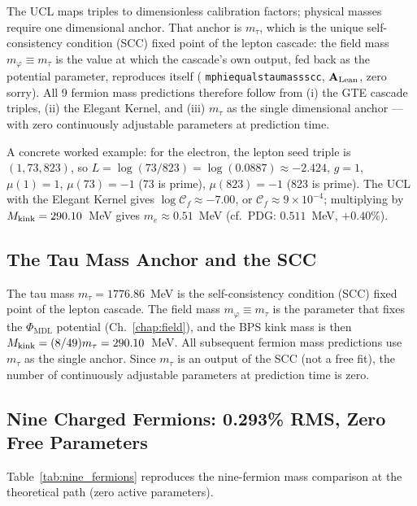 \documentclass[11pt,openany]{book}
\theoremstyle{remark}
\newcommand{\PHIMDL}{\Phi_{\mathrm{MDL}}}
\newcommand{\lean}[1]{%
  \penalty-100
  \begingroup\def\_{\textunderscore\allowbreak}\texttt{#1}\endgroup}
\newcommand{\Mkink}{M_{\rm kink}}
\newcommand{\CatAL}{\ensuremath{\textbf{A}_{\rm Lean}}}
\begin{document}
The UCL maps triples to dimensionless calibration factors; physical masses require one
dimensional anchor.  That anchor is $m_\tau$, which is the unique self-consistency
condition (SCC) fixed point of the lepton cascade: the field mass
$m_\varphi \equiv m_\tau$ is the value at which the cascade's own output, fed back
as the potential parameter, reproduces itself
(\lean{mphi\_equals\_tau\_mass\_scc}, \CatAL, zero sorry).
All 9 fermion mass predictions therefore follow from
(i) the GTE cascade triples, (ii) the Elegant Kernel, and (iii) $m_\tau$ as the single
dimensional anchor --- with zero continuously adjustable parameters at prediction time.

A concrete worked example: for the electron, the lepton seed triple is $(1, 73, 823)$,
so $L = \log(73/823) = \log(0.0887) \approx -2.424$, $g=1$, $\mu(1)=1$, $\mu(73)=-1$
(73 is prime), $\mu(823)=-1$ (823 is prime).
The UCL with the Elegant Kernel gives $\log \mathcal{C}_f \approx -7.00$, or
$\mathcal{C}_f \approx 9\times10^{-4}$; multiplying by $\Mkink = 290.10$~MeV gives
$m_e \approx 0.51$~MeV (cf.\ PDG: $0.511$~MeV, $+0.40\%$).

\subsection*{The Tau Mass Anchor and the SCC}

The tau mass $m_\tau = 1776.86$~MeV is the self-consistency condition (SCC) fixed point
of the lepton cascade.  The field mass $m_\varphi \equiv m_\tau$ is the parameter that
fixes the $\PHIMDL$ potential (Ch.~\ref{chap:field}), and the BPS kink mass is then
$\Mkink = (8/49)m_\tau = 290.10$~MeV.  All subsequent fermion mass predictions
use $m_\tau$ as the single anchor.  Since $m_\tau$ is an output of the SCC (not a
free fit), the number of continuously adjustable parameters at prediction time is zero.

\subsection*{Nine Charged Fermions: 0.293\% RMS, Zero Free Parameters}

Table~\ref{tab:nine_fermions} reproduces the nine-fermion mass comparison at the
theoretical path (zero active parameters).
\end{document}
